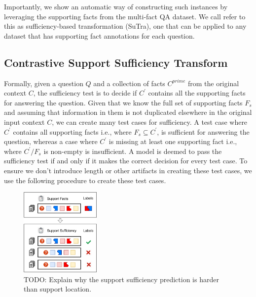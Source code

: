 Importantly, we show an automatic way of constructing such instances by leveraging the supporting facts from the multi-fact QA dataset. We call refer to this as sufficiency-based transformation (SuTra), one that can be applied to any \mf dataset that has supporting fact annotations for each question.


\subsection{Contrastive Support Sufficiency Transform}

Formally, given a question $Q$ and a collection of facts $C^{prime}$ from the original context $C$, the sufficiency test is to decide if $C^{\prime}$ contains all the supporting facts for answering the question. Given that we know the full set of supporting facts $F_s$ and assuming that information in them is not duplicated elsewhere in the original input context $C$, we can create many test cases for sufficiency. A test case where $C^{\prime}$ contains all supporting facts i.e., where $F_s \subseteq C^{\prime}$, is sufficient for answering the question, whereas a case where $C^{\prime}$ is missing at least one supporting fact i.e., where $C^{\prime}/F_s$ is non-empty is  insufficient. A model is deemed to pass the sufficiency test if and only if it makes the correct decision for every test case. To ensure we don't introduce length or other artifacts in creating these test cases, we use the following procedure to create these test cases.


\begin{figure}[t]
    \centering
	\includegraphics[width=0.35\textwidth]{images/transformation-v3}
	\caption{TODO: Explain why the support sufficiency prediction is harder than support location.}
	\label{fig:intro}
\end{figure}

